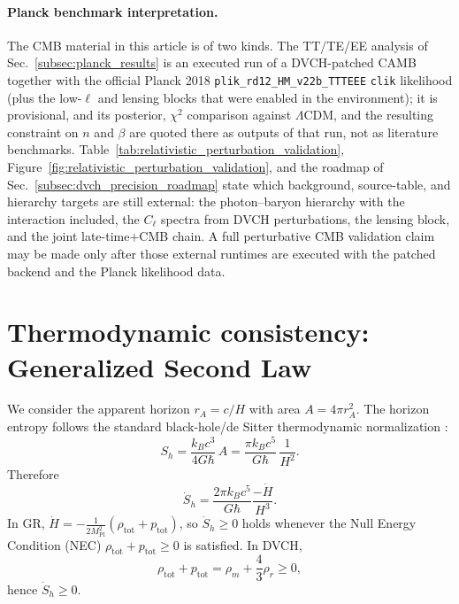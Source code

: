 \documentclass[pdflatex,sn-mathphys-num]{sn-jnl}%
\newcommand{\mpl}{M_{\mathrm{Pl}}}
\begin{document}
\paragraph{Planck benchmark interpretation.}
The CMB material in this article is of two kinds. The TT/TE/EE
analysis of Sec.~\ref{subsec:planck_results} is an executed run of
a DVCH-patched CAMB together with the official Planck 2018
\texttt{plik\_rd12\_HM\_v22b\_TTTEEE} \texttt{clik} likelihood (plus the
low-$\ell$ and lensing blocks that were enabled in the environment); it is
provisional, and its
posterior, $\chi^2$ comparison against $\Lambda$CDM, and the
resulting constraint on $n$ and $\beta$ are quoted there as outputs of that
run, not as literature benchmarks.
Table~\ref{tab:relativistic_perturbation_validation},
Figure~\ref{fig:relativistic_perturbation_validation}, and the roadmap of
Sec.~\ref{subsec:dvch_precision_roadmap} state which background,
source-table, and hierarchy targets are still external: the photon--baryon
hierarchy with the interaction included, the $C_\ell$ spectra from DVCH
perturbations, the lensing block, and the joint late-time$+$CMB chain. A full
perturbative CMB validation claim may be made only after those external
runtimes are executed with the patched backend and the Planck likelihood
data.

\section{Thermodynamic consistency: Generalized Second Law}
\label{sec:thermo}

We consider the apparent horizon $r_A = c/H$ with area $A=4\pi r_A^2$.
The horizon entropy follows the standard black-hole/de Sitter thermodynamic normalization \cite{Bekenstein:1973ur,Hawking:1975vcx,Gibbons:1977mu}:
\begin{equation}
S_h = \frac{k_B c^3}{4G\hbar}\,A
= \frac{\pi k_B c^5}{G\hbar}\,\frac{1}{H^2}.
\end{equation}
Therefore
\begin{equation}
\dot S_h = \frac{2\pi k_B c^5}{G\hbar}\frac{-\dot H}{H^3}.
\end{equation}
In GR, $\dot H = -\frac{1}{2\mpl^2}\left(\rho_{\mathrm{tot}}+p_{\mathrm{tot}}\right)$,
so $\dot S_h\ge 0$ holds whenever the Null Energy Condition (NEC)
$\rho_{\mathrm{tot}}+p_{\mathrm{tot}}\ge 0$ is satisfied.
In DVCH,
\begin{equation}
\rho_{\mathrm{tot}}+p_{\mathrm{tot}}=\rho_m+\frac{4}{3}\rho_r\ge 0,
\end{equation}
hence $\dot S_h\ge 0$.
\end{document}
